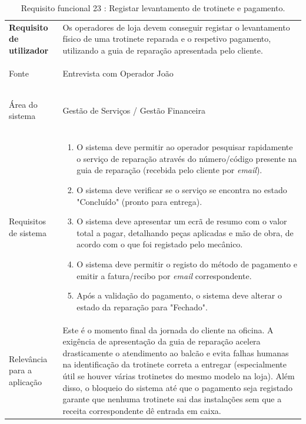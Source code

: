 \documentclass[a4paper,12pt]{scrreprt}
\begin{document}
\begin{table}[H]
    \centering
    \renewcommand{\arraystretch}{1.5} 
    
    \begin{tabular}{|>{\columncolor{gray!15}\bfseries}p{4cm}|p{10.5cm}|}
        \hline
        Requisito de utilizador & Os operadores de loja devem conseguir registar o levantamento físico de uma trotinete reparada e o respetivo pagamento, utilizando a guia de reparação apresentada pelo cliente. \\ \hdashline
        
        Fonte & Entrevista com Operador João \\ \hdashline
        
        Área do sistema & Gestão de Serviços / Gestão Financeira \\ \hdashline
        
        Requisitos de sistema & 
        \begin{enumerate}[leftmargin=*, nosep, topsep=2pt, partopsep=0pt]
            \item O sistema deve permitir ao operador pesquisar rapidamente o serviço de reparação através do número/código presente na guia de reparação (recebida pelo cliente por \textit{email}).
            \item O sistema deve verificar se o serviço se encontra no estado "Concluído" \space(pronto para entrega).
            \item O sistema deve apresentar um ecrã de resumo com o valor total a pagar, detalhando peças aplicadas e mão de obra, de acordo com o que foi registado pelo mecânico.
            \item O sistema deve permitir o registo do método de pagamento e emitir a fatura/recibo por \textit{email} correspondente.
            \item Após a validação do pagamento, o sistema deve alterar o estado da reparação para "Fechado".
        \end{enumerate} \\ \hdashline
        
        Relevância para a aplicação & Este é o momento final da jornada do cliente na oficina. A exigência de apresentação da guia de reparação acelera drasticamente o atendimento ao balcão e evita falhas humanas na identificação da trotinete correta a entregar (especialmente útil se houver várias trotinetes do mesmo modelo na loja). Além disso, o bloqueio do sistema até que o pagamento seja registado garante que nenhuma trotinete sai das instalações sem que a receita correspondente dê entrada em caixa.\\ \hline
    \end{tabular}
    \caption{Requisito funcional 23 : Registar levantamento de trotinete e pagamento.}
    \label{tab:rf_levantamento_trotinete}
\end{table}
\end{document}
